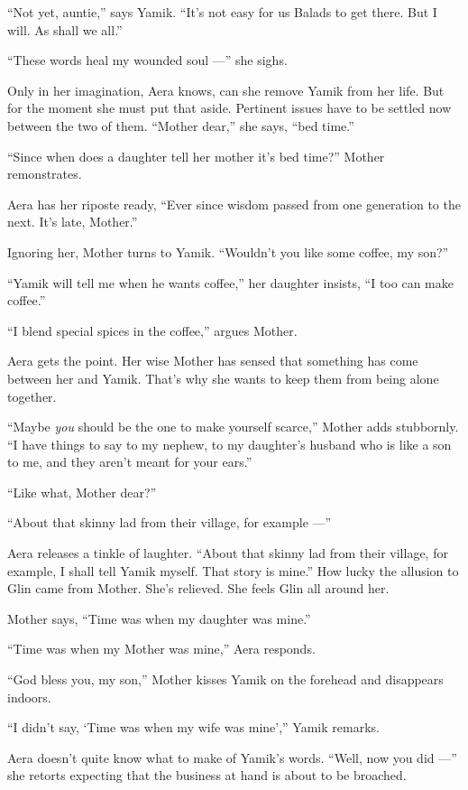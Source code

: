 \documentclass[twoside,11pt,openany]{book}
\begin{document}
``Not yet, auntie,'' says Yamik. ``It's not easy for us Balads to get there. But I will. As shall we all.''

``These words heal my wounded soul ---'' she sighs.

Only in her imagination, Aera knows, can she remove Yamik from her life. But for the moment she must put that aside.
Pertinent issues have to be settled now between the two of them. ``Mother dear,'' she says, ``bed time.''

``Since when does a daughter tell her mother it's bed time?''  Mother remonstrates.

Aera has her riposte ready, ``Ever since wisdom passed from one generation to the next. It's late, Mother.''

Ignoring her, Mother turns to Yamik. {}``Wouldn't you like some coffee, my son?''

``Yamik will tell me when he wants coffee,'' her daughter insists, ``I too can make
coffee.''

{}``I blend special spices in the coffee,'' argues Mother.

Aera gets the point. Her wise Mother has sensed that something has come between her and Yamik. That's why she wants to
keep them from being alone together.

{}``Maybe \textit{you} should be the one to make yourself scarce,'' Mother adds stubbornly. ``I have things to say to my
nephew, to my daughter's husband who is like a son to me, and they aren't meant for your ears.''

{}``Like what, Mother dear?''

{}``About that skinny{ }lad from their village, for example ---''

Aera releases a tinkle of laughter.  ``About that skinny lad from their village, for example, I shall tell Yamik
myself. That story is mine.'' How lucky the allusion to Glin came from Mother. She's relieved. She feels Glin all
around her.

Mother says, ``Time was when my daughter was mine.''

 ``Time was when my Mother was mine,{}'' Aera responds.

``God bless you, my son,'' Mother kisses Yamik on the forehead and disappears indoors.

``I didn't say, `Time was when my wife was mine','' Yamik remarks.

Aera doesn't quite know what to make of Yamik's words.
``Well, now you did ---'' she retorts expecting that the business at hand is about to be broached.
\end{document}
